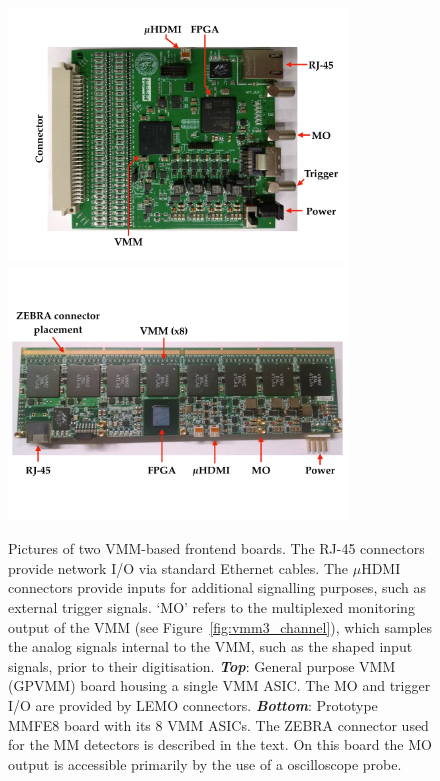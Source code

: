 \begin{figure}[!htb]
    \begin{center}
        \includegraphics[width=0.8\textwidth]{figures/nsw/frontend/gpvmm_labelledPDF}
        \includegraphics[width=0.8\textwidth]{figures/nsw/frontend/mmfe8_labelledPDF}
        \caption{
            Pictures of two VMM-based frontend boards. The RJ-45 connectors provide network I/O via
            standard Ethernet cables.
            The $\mu$HDMI connectors provide inputs for additional signalling purposes, such as external
            trigger signals.
            `MO' refers to the multiplexed monitoring output of the VMM (see Figure~\ref{fig:vmm3_channel}), which samples the analog
            signals internal to the VMM, such as the shaped input signals, prior to their digitisation.
            \textbf{\textit{Top}}: General purpose VMM (GPVMM) board housing a single VMM ASIC.
            The MO and trigger I/O are provided by LEMO connectors.
            \textbf{\textit{Bottom}}: Prototype MMFE8 board with its 8 VMM ASICs.
            The ZEBRA connector used for the MM detectors is described in the text.
            On this board the MO output is accessible primarily by the use of a oscilloscope probe.
        }
        \label{fig:frontend_boards}
    \end{center}
\end{figure}

